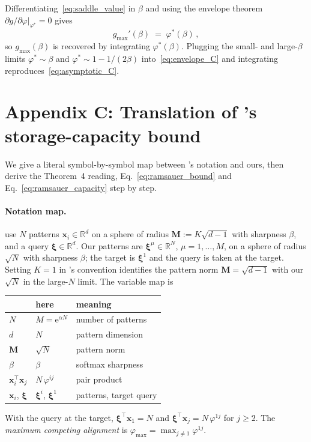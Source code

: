 \documentclass[letterpaper]{article} %
\newcommand{\bxi}{\boldsymbol{\xi}}
\newcommand{\e}{{\mathrm{e}}}
\newcommand{\Bnet}{\beta}
\newcommand{\p}{\partial}
\begin{document}
Differentiating~\eqref{eq:saddle_value} in $\Bnet$ and using the
envelope theorem $\p g/\p\varphi|_{\varphi^*} = 0$ gives
\begin{equation}
g_{\max}'(\Bnet) \;=\; \varphi^*(\Bnet)\,,
\label{eq:envelope_C}
\end{equation}
so $g_{\max}(\Bnet)$ is recovered by integrating $\varphi^*(\Bnet)$.
Plugging the small- and large-$\Bnet$ limits $\varphi^* \sim \Bnet$
and $\varphi^* \sim 1 - 1/(2\Bnet)$ into~\eqref{eq:envelope_C} and
integrating reproduces~\eqref{eq:asymptotic_C}.


\section{Appendix C: Translation of \citeauthor{ramsauer2021hopfield}'s storage-capacity bound}
\label{sec:appendix_ramsauer}

We give a literal symbol-by-symbol map between
\citeauthor{ramsauer2021hopfield}'s notation and ours, then derive
the Theorem~4 reading, Eq.~\eqref{eq:ramsauer_bound} and
Eq.~\eqref{eq:ramsauer_capacity} step by step.

\paragraph{Notation map.}
\citeauthor{ramsauer2021hopfield} use $N$ patterns
$\bm x_i \in \mathbb R^d$ on a sphere of radius
$\mathbf M := K\sqrt{d-1}$ with sharpness $\beta$, and a query
$\bm \xi \in \mathbb R^d$.  Our patterns are
$\bxi^\mu \in \mathbb R^N$, $\mu = 1, \dots, M$, on a sphere of
radius $\sqrt N$ with sharpness $\Bnet$; the target is $\bxi^1$ and
the query is taken at the target.  Setting $K = 1$ in
\citeauthor{ramsauer2021hopfield}'s convention identifies the
pattern norm $\mathbf M = \sqrt{d-1}$ with our $\sqrt N$ in the
large-$N$ limit.  The variable map is
\begin{center}
\begin{tabular}{lll}
\hline
\citeauthor{ramsauer2021hopfield} & here & meaning \\
\hline
$N$ & $M = \e^{\alpha N}$ & number of patterns \\
$d$ & $N$ & pattern dimension \\
$\mathbf M$ & $\sqrt N$ & pattern norm \\
$\beta$ & $\Bnet$ & softmax sharpness \\
$\bm x_i^\top \bm x_j$ & $N\,\varphi^{ij}$ & pair product \\
$\bm x_i$, $\bm \xi$ & $\bxi^i$, $\bxi^1$ & patterns, target query \\
\hline
\end{tabular}
\end{center}
With the query at the target, $\bm \xi^\top \bm x_1 = N$ and
$\bm \xi^\top \bm x_j = N\,\varphi^{1j}$ for $j \geq 2$.  The
\emph{maximum competing alignment} is
$\varphi_{\max} = \max_{j \neq 1}\varphi^{1j}$.
\end{document}
